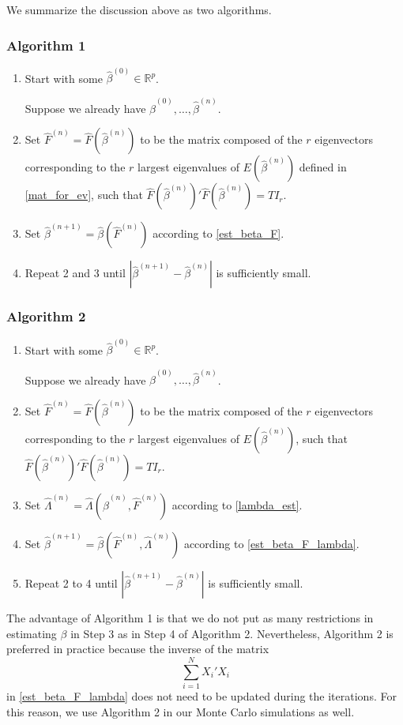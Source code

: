 \documentclass[a4paper]{article}
\newcommand{\IR}[0]{\mathbb{R}}
\begin{document}
We summarize the discussion above as two algorithms.
\subsubsection*{Algorithm 1}
\begin{enumerate}
	\item Start with some $\hat \beta^{(0)} \in \IR^p$.

	Suppose we already have $\hat \beta^{(0)}, \ldots, \hat \beta^{(n)}$.
	\item Set $\hat F^{(n)}=\hat F( \hat \beta^{(n)})$ to be the matrix composed of the $r$ eigenvectors corresponding to the $r$ largest eigenvalues of $E(\hat \beta^{(n)})$ defined in \eqref{mat_for_ev}, such that $\hat F( \hat \beta^{(n)})'\hat F( \hat \beta^{(n)})=TI_r$.
	\item Set $\hat \beta^{(n+1)}=\hat\beta(\hat F^{(n)})$ according to \eqref{est_beta_F}.
	\item Repeat 2 and 3 until $|\hat \beta^{(n+1)}-\hat \beta^{(n)}|$ is sufficiently small.
\end{enumerate}

\subsubsection*{Algorithm 2}
\begin{enumerate}
	\item Start with some $\hat \beta^{(0)} \in \IR^p$.

	Suppose we already have $\hat \beta^{(0)}, \ldots, \hat \beta^{(n)}$.
	\item Set $\hat F^{(n)}=\hat F( \hat \beta^{(n)})$ to be the matrix composed of the $r$ eigenvectors corresponding to the $r$ largest eigenvalues of $E(\hat \beta^{(n)})$, such that $\hat F( \hat \beta^{(n)})'\hat F( \hat \beta^{(n)})=TI_r$.
	\item Set $\hat \Lambda^{(n)}=\hat \Lambda(\hat \beta^{(n)},\hat F^{(n)})$ according to \eqref{lambda_est}.
	\item Set $\hat \beta^{(n+1)}=\hat\beta(\hat F^{(n)},\hat \Lambda^{(n)})$ according to \eqref{est_beta_F_lambda}.
	\item Repeat 2 to 4 until $|\hat \beta^{(n+1)}-\hat \beta^{(n)}|$ is sufficiently small.
\end{enumerate}
The advantage of Algorithm 1 is that we do not put as many restrictions in estimating $\beta$ in Step 3 as in Step 4 of Algorithm 2. Nevertheless, Algorithm 2 is preferred in practice because the inverse of the matrix
\[
	\sum_{i=1}^{N}X_i'X_i
\]
 in \eqref{est_beta_F_lambda} does not need to be updated during the iterations. For this reason, we use Algorithm 2 in our Monte Carlo simulations as well.
\end{document}

